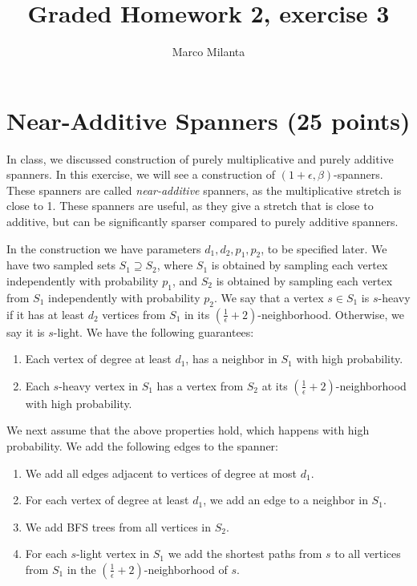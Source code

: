 \documentclass[11pt]{article}
\begin{document}
\author{Marco Milanta}
\title{Graded Homework 2, exercise 3}
\maketitle


\section*{Near-Additive Spanners (25 points)}

In class, we discussed construction of purely multiplicative and purely additive spanners. In this exercise, we will see a construction of $(1+\epsilon,\beta)$-spanners. These spanners are called \emph{near-additive} spanners, as the multiplicative stretch is close to 1. These spanners are useful, as they give a stretch that is close to additive, but can be significantly sparser compared to purely additive spanners.

In the construction we have parameters $d_1,d_2,p_1,p_2$, to be specified later.
We have two sampled sets $S_1 \supseteq S_2$, where $S_1$ is obtained by sampling each vertex independently with probability $p_1$, and $S_2$ is obtained by sampling each vertex from $S_1$ independently with probability $p_2$.
We say that a vertex $s \in S_1$ is $s$-heavy if it has at least $d_2$ vertices from $S_1$ in its $(\frac{1}{\epsilon} + 2)$-neighborhood. Otherwise, we say it is $s$-light.
We have the following guarantees:
\begin{enumerate}
    \item Each vertex of degree at least $d_1$, has a neighbor in $S_1$ with high probability.
    \item Each $s$-heavy vertex in $S_1$ has a vertex from $S_2$ at its $(\frac{1}{\epsilon} + 2)$-neighborhood with high probability. 
\end{enumerate}

We next assume that the above properties hold, which happens with high probability.
We add the following edges to the spanner:
\begin{enumerate}
    \item We add all edges adjacent to vertices of degree at most $d_1$.
    \item For each vertex of degree at least $d_1$, we add an edge to a neighbor in $S_1$.
    \item We add BFS trees from all vertices in $S_2$.
    \item For each $s$-light vertex in $S_1$ we add the shortest paths from $s$ to all vertices from $S_1$ in the $(\frac{1}{\epsilon} + 2)$-neighborhood of $s$. 
\end{enumerate}
\end{document}
